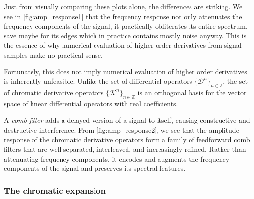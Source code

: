 \documentclass[11pt]{article} %
\theoremstyle{plain}
\theoremstyle{definition}
\theoremstyle{remark}
\begin{document}
Just from visually comparing these plots alone, the differences are striking. We see in
\cref{fig:amp_response1} that the frequency response not only attenuates the frequency
components of the signal, it practically obliterates its entire spectrum, save maybe for 
its edges which in practice contains mostly noise anyway. This is the essence of why 
numerical evaluation of higher order derivatives from signal samples make no practical 
sense.

Fortunately, this does not imply numerical evaluation of higher order derivatives is
inherently unfeasible. Unlike the set of differential operators $\{\mathcal{D}^n\}_
{n\in\mathbb{Z}}$, the set of chromatic derivative operators $\{\mathcal{K}^n\}_
{n\in\mathbb{Z}}$ is an orthogonal basis for the vector space of linear differential 
operators with real coefficients.

A \emph{comb filter} adds a delayed version of a signal to itself, causing constructive 
and destructive interference. From \cref{fig:amp_response2}, we see that the amplitude
response of the chromatic derivative operators form a family of feedforward comb filters
that are well-separated, interleaved, and increasingly refined. Rather than attenuating
frequency components, it encodes and augments the frequency components of the signal
and preserves its spectral features.

\subsubsection{The chromatic expansion}
\end{document}
